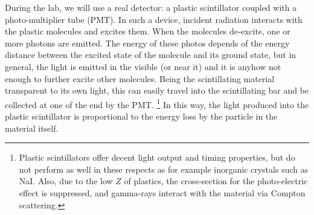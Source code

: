 \documentclass[a4,11pt, notitlepage]{article}
\begin{document}
During the lab, we will use a real detector: a plastic scintillator coupled with a photo-multiplier tube (PMT). 
In such a device, incident radiation interacts with the plastic molecules and excites them. 
%
%
When the molecules de-excite, one or more photons are emitted. The energy of these photos depends of the energy distance between the excited state of the molecule and its ground state, but in general, the light is emitted in the visible (or near it) and it is anyhow not enough to further excite other molecules. 
Being the scintillating material transparent to its own light, this can easily travel into the scintillating bar and be collected at one of the end by the PMT.
\footnote{
Plastic scintillators offer decent light output and timing properties, but do
not perform as well in these respects as for example inorganic crystals such as
NaI. Also, due to the low $Z$ of plastics, the cross-section for the
photo-electric effect is suppressed, and gamma-rays interact with the material
via Compton scattering.} 
In this way, the light produced into the plastic scintillator is proportional to the energy loss by the particle in the material itself. 
\end{document}
